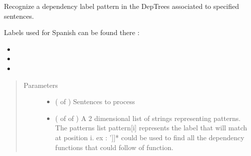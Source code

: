 \documentclass[letterpaper,10pt,english]{sphinxmanual}
\begin{document}
\begin{fulllineitems}
\begin{quote}
\begin{description}
\end{description}\end{quote}

\end{fulllineitems}


\begin{fulllineitems}
\label{\detokenize{analysis:loacore.analysis.pattern_recognition.label_patterns_recognition}}
Recognize a dependency label pattern in the DepTrees associated to specified sentences.

Labels used for Spanish can be found there :
\begin{itemize}
\item {} 

\item {} 

\item {} 

\end{itemize}
\begin{quote}\begin{description}
\item[{Parameters}] \leavevmode\begin{itemize}
\item {} 
 ( of {\hyperref[\detokenize{classes:loacore.classes.classes.Sentence}]{}}) \textendash{} Sentences to process

\item {} 
 ( of  of ) \textendash{} A 2 dimensional list of strings representing patterns. The patterns list pattern{[}i{]} represents the label that
will match at position i. ex : \sphinxstyleemphasis{pattern = {[}{[}‘sentence’, ‘v’{]}, {[}‘}’{]}{]}* could be used to find all the dependency
functions that could follow  of  function.


\end{itemize}
\end{description}
\end{quote}
\end{fulllineitems}
\end{document}
